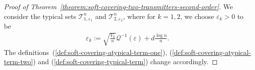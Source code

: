 \documentclass[journal]{IEEEtran}
\newcommand{\codebookBlocklength}{n}
\newcommand{\txIndex}{k}
\newcommand{\typicalityParam}{\varepsilon}
\newcommand{\typicalSetIndex}[3]{\mathcal{T}_{#3,#1}^{#2}}
\newcommand{\channelDispersion}[1]{V_{#1}}
\newcommand{\normalcdfComplementInverse}{\mathcal{Q}^{-1}}
\newcommand{\secondOrderParamD}{d}
\begin{document}
\begin{proof}[Proof of Theorem~\ref{theorem:soft-covering-two-transmitters-second-order}]
We consider the typical sets $\typicalSetIndex{\typicalityParam_1}{\codebookBlocklength}{1}$ and $\typicalSetIndex{\typicalityParam_2}{\codebookBlocklength}{2}$, where for $\txIndex=1,2$, we choose $\typicalityParam_\txIndex >0$ to be
\begin{align}
\label{proof:soft-covering-two-transmitters-second-order-typicalityparam}
\typicalityParam_\txIndex
:=
\sqrt{\frac{\channelDispersion{\txIndex}}
           {\codebookBlocklength}
}
\normalcdfComplementInverse(\typicalityParam)
+
\secondOrderParamD
\frac{\log \codebookBlocklength}{\codebookBlocklength}.
\end{align}
The definitions~(\ref{def:soft-covering-atypical-term-one}), (\ref{def:soft-covering-atypical-term-two}) and (\ref{def:soft-covering-typical-term}) change accordingly.


\end{proof}
\end{document}

